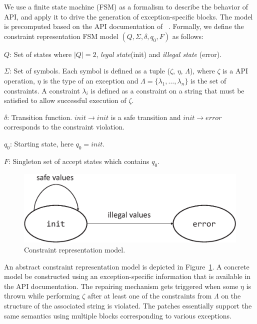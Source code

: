 
  We use a finite state machine
(FSM) as a formalism to describe the behavior of \java\  API, and 
apply it to drive the generation of exception-specific  blocks. The
model is precomputed based on the API documentation of \java\ .
Formally, we define the constraint representation FSM model $(Q, \Sigma, \delta,
q_0, F)$ as follows:
\begin{mybullet}
 \item $Q$: Set of states where $|Q| = 2$, \emph{legal state}(init) and
\emph{illegal state} (error).

 \item $\Sigma$: Set of symbols. Each symbol is defined as a tuple ($\zeta$,
$\eta$, $\Lambda$), where $\zeta$ is a  API operation, $\eta$ is
the type of an exception and $\Lambda = \{\lambda_1, \ldots, \lambda_n\}$  is
the set of constraints. A constraint $\lambda_i$ is defined as a constraint on
a string that must be satisfied to allow successful execution of $\zeta$.

 \item $\delta$: Transition function. $init \rightarrow init$ is a safe
transition and $init \rightarrow error$ corresponds to the constraint violation.

 \item $q_0$: Starting state, here $q_0 = init$.

 \item $F$: Singleton set of accept states which contains $q_0$.
\end{mybullet}

\begin{figure}[t]
\centering
\includegraphics[scale=.25]{images/automata.eps}
\caption{Constraint representation model.}
\label{fig:constraintautomata}
\end{figure}

An abstract constraint representation model is depicted in
Figure~\ref{fig:constraintautomata}. A concrete model be constructed using an
exception-specific information that is available in the API documentation. The
repairing mechanism gets triggered when some $\eta$ is thrown while performing
$\zeta$ after at least one of the constraints from $\Lambda$ on the structure of
the associated string is violated. The patches essentially support the same
semantics using multiple  blocks corresponding to various
exceptions.

